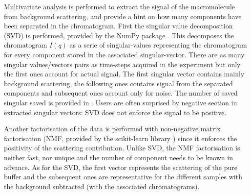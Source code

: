\documentclass[preprint]{iucr}              %
\begin{document}
Multivariate analysis is performed to extract the signal of the macromolecule from background scattering, and provide a hint on how many components have been separated in the chromatogram. 
First the singular value decomposition (SVD) is performed, provided by the NumPy package \cite{numpy}.
This decomposes the chromatogram $I(q)$ as a serie of singular-values representing the chromatogram for every component stored in the associated singular-vector. 
There are as many singular values/vectors pairs as time-steps acquired in the experiment but only the first ones account for actual signal.
The first singular vector contains mainly background scattering, the following ones contains signal from the separated components and subsequent ones account only for noise. 
The number of saved singular saved is provided in \cite{svd_threshold}.
Users are often surprised by negative section in extracted singular vectors: SVD does not enforce the signal to be positive.

Another factorisation of the data is performed with non-negative matrix factorisation (NMF, provided by the scikit-learn library \cite{sklearn}) since it enforces the positivity of the scattering contribution. 
Unlike SVD, the NMF factorisation is neither fast, nor unique and the number of component needs to be known in advance.
As for the SVD, the first vector represents the scattering of the pure buffer and the subsequent ones 
are representative for the different samples with the background subtracted (with the associated chromatograms).
\end{document}
